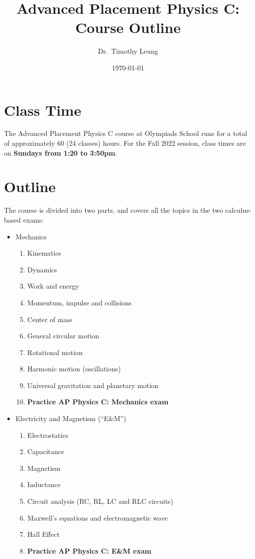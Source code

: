 \documentclass{../../oss-handout}
\title{Advanced Placement Physics C: Course Outline}
\author{Dr.\ Timothy Leung}%
\date{\today}
\begin{document}
\thispagestyle{title}
\gentitle

\section*{Class Time}
The Advanced Placement Physics C course at Olympiads School runs for a total of
approximately 60 (24 classes) hours. For the Fall 2022 session, class times
are on \textbf{Sundays from 1:20 to 3:50pm}.

\section*{Outline}
The course is divided into two parts, and covers all the topics in the two
calculus-based exams:
\begin{itemize}[nosep,leftmargin=15pt]
\item Mechanics
  \begin{enumerate}[nosep]
  \item Kinematics
  \item Dynamics
  \item Work and energy
  \item Momentum, impulse and collisions
  \item Center of mass
  \item General circular motion
  \item Rotational motion
  \item Harmonic motion (oscillations)
  \item Universal gravitation and planetary motion
  \item\textbf{Practice AP Physics C: Mechanics exam}
  \end{enumerate}
\item Electricity and Magnetism (``E\&M'')
  \begin{enumerate}
  \item Electrostatics
  \item Capacitance
  \item Magnetism
  \item Inductance
  \item Circuit analysis (RC, RL, LC and RLC circuits)
  \item Maxwell's equations and electromagnetic wave
  \item Hall Effect
  \item\textbf{Practice AP Physics C: E\&M exam}
  \end{enumerate}
\end{itemize}
\end{document}
